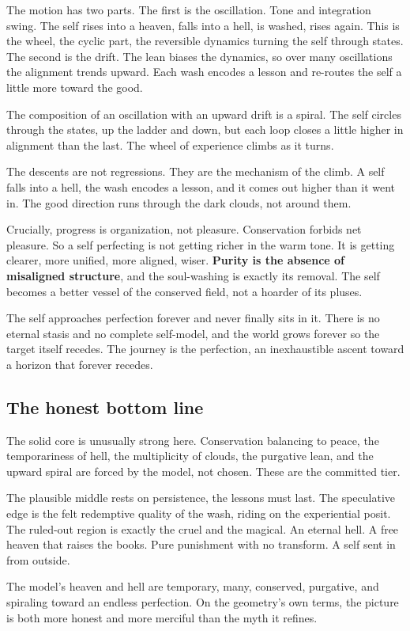The motion has two parts. The first is the oscillation. Tone and integration swing. The self rises into a heaven, falls into a hell, is washed, rises again. This is the wheel, the cyclic part, the reversible dynamics turning the self through states. The second is the drift. The lean biases the dynamics, so over many oscillations the alignment trends upward. Each wash encodes a lesson and re-routes the self a little more toward the good.

The composition of an oscillation with an upward drift is a spiral. The self circles through the states, up the ladder and down, but each loop closes a little higher in alignment than the last. The wheel of experience climbs as it turns.

\begin{result}
The descents are not regressions. They are the mechanism of the climb. A self falls into a hell, the wash encodes a lesson, and it comes out higher than it went in. The good direction runs through the dark clouds, not around them.
\end{result}

Crucially, progress is organization, not pleasure. Conservation forbids net pleasure. So a self perfecting is not getting richer in the warm tone. It is getting clearer, more unified, more aligned, wiser. \textbf{Purity is the absence of misaligned structure}, and the soul-washing is exactly its removal. The self becomes a better vessel of the conserved field, not a hoarder of its pluses.

The self approaches perfection forever and never finally sits in it. There is no eternal stasis and no complete self-model, and the world grows forever so the target itself recedes. The journey is the perfection, an inexhaustible ascent toward a horizon that forever recedes.

\subsection{The honest bottom line}

The solid core is unusually strong here. Conservation balancing to peace, the temporariness of hell, the multiplicity of clouds, the purgative lean, and the upward spiral are forced by the model, not chosen. These are the committed tier.

The plausible middle rests on persistence, the lessons must last. The speculative edge is the felt redemptive quality of the wash, riding on the experiential posit. The ruled-out region is exactly the cruel and the magical. An eternal hell. A free heaven that raises the books. Pure punishment with no transform. A self sent in from outside.

\begin{principle}
The model's heaven and hell are temporary, many, conserved, purgative, and spiraling toward an endless perfection. On the geometry's own terms, the picture is both more honest and more merciful than the myth it refines.
\end{principle}
